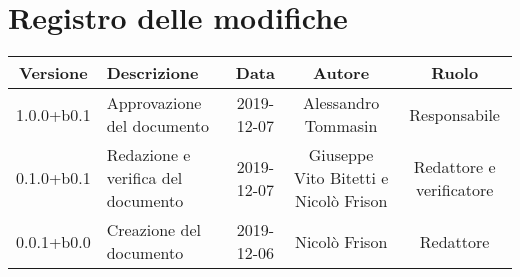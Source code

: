 \section*{Registro delle modifiche}

\begin{center}
	\begin{longtable}{|c|p{3cm}|c|c|c|}
	\hline
	\rowcolor{lighter-grayer}
	\textbf{Versione} & \textbf{Descrizione} & \textbf{Data} & \textbf{Autore} & \textbf{Ruolo} \\
	\hline
	\endfirsthead


	1.0.0+b0.1 & Approvazione del documento & 2019-12-07 & Alessandro Tommasin & Responsabile \\
	\hline
	0.1.0+b0.1 & Redazione e verifica del documento & 2019-12-07 & Giuseppe Vito Bitetti e Nicolò Frison & Redattore e verificatore \\
	\hline
	0.0.1+b0.0 & Creazione del documento & 2019-12-06 & Nicolò Frison & Redattore \\

	\hline

	\end{longtable}
\end{center}
